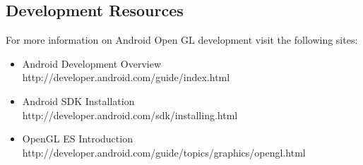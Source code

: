 \documentclass[12pt,a4paper]{article}
\begin{document}
\subsection{Development Resources}
For more information on Android Open GL development visit the following sites:
\begin{itemize}
\item Android Development Overview
\\http://developer.android.com/guide/index.html
\item Android SDK Installation
\\http://developer.android.com/sdk/installing.html
\item OpenGL ES Introduction \\ http://developer.android.com/guide/topics/graphics/opengl.html
\end{itemize}
\end{document}
